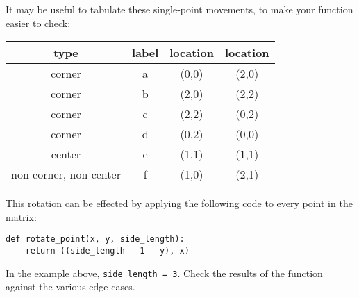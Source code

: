 \documentclass[12pt]{scrartcl}
\begin{document}
It may be useful to tabulate these single-point movements, to make your function easier to check:

\begin{table}[htdp]
 \begin{center}
  \begin{tabular}{|c|c|c|c|}\hline
   type & label & location & location \\ \hline
   corner & a & (0,0) & (2,0) \\ \hline
   corner & b & (2,0) & (2,2) \\ \hline
   corner & c & (2,2) & (0,2) \\ \hline
   corner & d & (0,2) & (0,0) \\ \hline
   center & e & (1,1) & (1,1) \\ \hline
   non-corner, non-center & f & (1,0) & (2,1) \\ \hline
  \end{tabular}
 \end{center}
\end{table}%

This rotation can be effected by applying the following code to every point in the matrix:

\begin{lstlisting}
def rotate_point(x, y, side_length):
    return ((side_length - 1 - y), x)
\end{lstlisting}

In the example above, \texttt{side\_length = 3}. Check the results of the function against the various edge cases.
\end{document}
